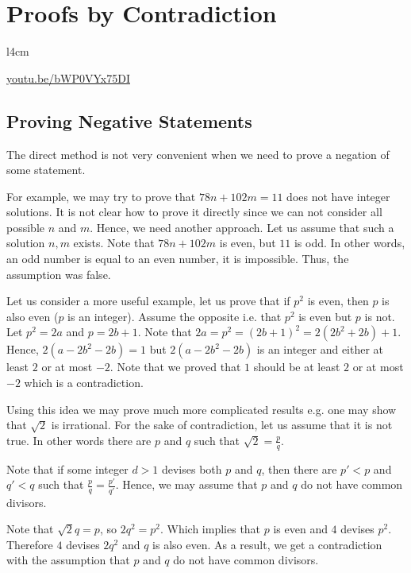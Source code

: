 \chapter{Proofs by Contradiction}
\begin{wrapfigure}{l}{4cm}
  \begin{center}
    \vskip -0.5cm
    \vskip 0.25cm
    \href{https://youtu.be/bWP0VYx75DI}{youtu.be/bWP0VYx75DI}
  \end{center}
  \vskip -0.5cm
\end{wrapfigure}
\section{Proving Negative Statements}
The direct method is not very convenient when we need to prove a negation of
some statement.

For example, we may try to prove that $78 n + 102 m = 11$ does not have integer
solutions. It is not clear how to prove it directly since we can not consider
all possible $n$ and $m$. Hence, we need another approach. Let us assume that
such a solution $n, m$ exists. Note that $78 n + 102 m$ is even, but $11$ is
odd. In other words, an odd number is equal to an even number, it is impossible.
Thus, the assumption was false.

Let us consider a more useful example, let us prove that if $p^2$ is even, then
$p$ is also even ($p$ is an integer). Assume the opposite i.e. that $p^2$ is
even but $p$ is not. Let $p^2 = 2a$ and $p = 2b + 1$. Note that
$2a = p^2 = (2b + 1)^2 = 2(2b^2 + 2b) + 1$. Hence, $2(a - 2b^2 - 2b) = 1$ but
$2(a - 2b^2 - 2b)$ is an integer and either at least $2$ or at most $-2$. Note
that we proved that $1$ should be at least $2$ or at most $-2$ which is a
contradiction.

Using this idea we may prove much more complicated results e.g. one may show
that $\sqrt{2}$ is irrational. For the sake of contradiction, let us assume
that it is not true. In other words there are $p$ and $q$ such that
$\sqrt{2} = \frac{p}{q}$.

Note that if some integer $d > 1$ devises both $p$ and $q$, then there are
$p' < p$ and $q' < q$ such that $\frac{p}{q} = \frac{p'}{q'}$. Hence, we may
assume that $p$ and $q$ do not have common divisors.

Note that $\sqrt{2} q = p$, so $2q^2 = p^2$. Which implies that $p$ is even
and $4$ devises $p^2$. Therefore $4$ devises $2q^2$ and $q$ is also even. As
a result, we get a contradiction with the assumption that $p$ and $q$ do not
have common divisors.

